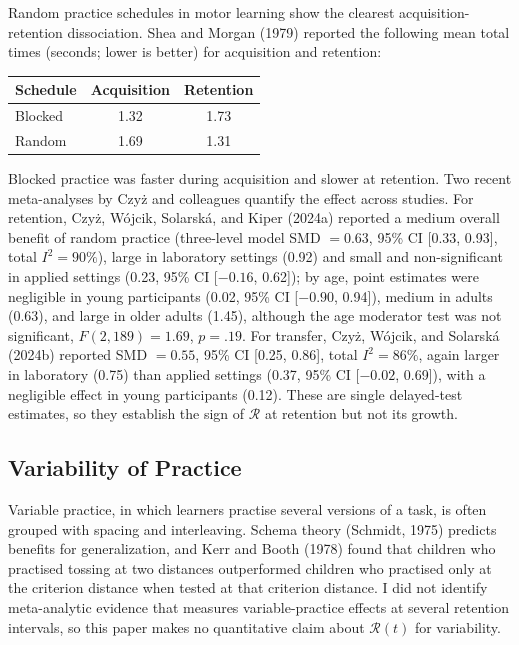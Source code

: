 \documentclass[10pt,twocolumn]{article}
\newcommand{\effr}{\mathcal{R}}
\begin{document}
Random practice schedules in motor learning show the clearest acquisition-retention dissociation. Shea and Morgan (1979) reported the following mean total times (seconds; lower is better) for acquisition and retention:

\begin{center}
\small
\begin{tabular}{@{}lcc@{}}
\toprule
Schedule & Acquisition & Retention \\
\midrule
Blocked & 1.32 & 1.73 \\
Random & 1.69 & 1.31 \\
\bottomrule
\end{tabular}
\end{center}

Blocked practice was faster during acquisition and slower at retention. Two recent meta-analyses by Czy\.{z} and colleagues quantify the effect across studies. For retention, Czy\.{z}, W\'{o}jcik, Solarsk\'{a}, and Kiper (2024a) reported a medium overall benefit of random practice (three-level model SMD $= 0.63$, 95\% CI [0.33, 0.93], total $I^2 = 90\%$), large in laboratory settings (0.92) and small and non-significant in applied settings (0.23, 95\% CI [$-0.16$, 0.62]); by age, point estimates were negligible in young participants (0.02, 95\% CI [$-0.90$, 0.94]), medium in adults (0.63), and large in older adults (1.45), although the age moderator test was not significant, $F(2, 189) = 1.69$, $p = .19$. For transfer, Czy\.{z}, W\'{o}jcik, and Solarsk\'{a} (2024b) reported SMD $= 0.55$, 95\% CI [0.25, 0.86], total $I^2 = 86\%$, again larger in laboratory (0.75) than applied settings (0.37, 95\% CI [$-0.02$, 0.69]), with a negligible effect in young participants (0.12). These are single delayed-test estimates, so they establish the sign of $\effr$ at retention but not its growth.

\subsection{Variability of Practice}

Variable practice, in which learners practise several versions of a task, is often grouped with spacing and interleaving. Schema theory (Schmidt, 1975) predicts benefits for generalization, and Kerr and Booth (1978) found that children who practised tossing at two distances outperformed children who practised only at the criterion distance when tested at that criterion distance. I did not identify meta-analytic evidence that measures variable-practice effects at several retention intervals, so this paper makes no quantitative claim about $\effr(t)$ for variability.
\end{document}
